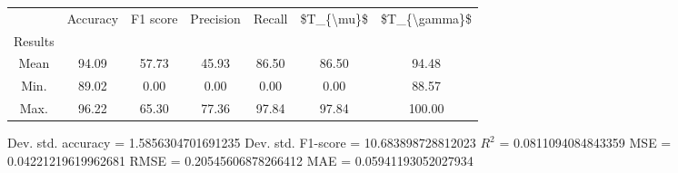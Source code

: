 \begin{tabular}{|c|c|c|c|c|c|c|}
\toprule
{} &  Accuracy &  F1 score &  Precision &  Recall &  \$T\_\{\textbackslash mu\}\$ &  \$T\_\{\textbackslash gamma\}\$ \\
Results &           &           &            &         &            &               \\
\hline
Mean    &     94.09 &     57.73 &      45.93 &   86.50 &      86.50 &         94.48 \\
Min.    &     89.02 &      0.00 &       0.00 &    0.00 &       0.00 &         88.57 \\
Max.    &     96.22 &     65.30 &      77.36 &   97.84 &      97.84 &        100.00 \\
\bottomrule
\end{tabular}

 Dev. std. accuracy = 1.5856304701691235
 Dev. std. F1-score = 10.683898728812023
 $R^2$ = 0.0811094084843359
 MSE = 0.04221219619962681
 RMSE = 0.20545606878266412
 MAE = 0.05941193052027934